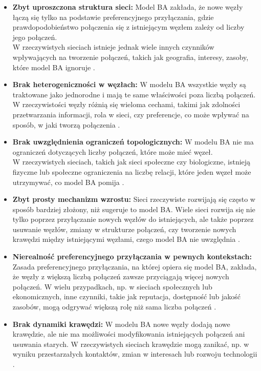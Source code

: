\begin{itemize}
      \item \textbf{Zbyt uproszczona struktura sieci:} Model BA zakłada, że nowe węzły łączą się tylko na podstawie preferencyjnego przyłączania,
            gdzie prawdopodobieństwo połączenia się z istniejącym węzłem zależy od liczby jego połączeń.
            \\ W rzeczywistych sieciach istnieje jednak wiele innych czynników wpływających na tworzenie połączeń, takich jak geografia, interesy, zasoby, które model BA ignoruje \cite{Newman2003}.

      \item \textbf{Brak heterogeniczności w węzłach:} W modelu BA wszystkie węzły są traktowane jako jednorodne i mają te same właściwości poza liczbą połączeń.
            W rzeczywistości węzły różnią się wieloma cechami, takimi jak zdolności przetwarzania informacji, rola w sieci, czy preferencje, co może wpływać na sposób, w jaki tworzą połączenia \cite{Klemm2002}.

      \item \textbf{Brak uwzględnienia ograniczeń topologicznych:} W modelu BA nie ma ograniczeń dotyczących liczby połączeń, które może mieć węzeł.
            \\ W rzeczywistych sieciach, takich jak sieci społeczne czy biologiczne, istnieją fizyczne lub społeczne ograniczenia na liczbę relacji, które jeden węzeł może utrzymywać, co model BA pomija \cite{Amaral2000}.

      \item \textbf{Zbyt prosty mechanizm wzrostu:} Sieci rzeczywiste rozwijają się często w sposób bardziej złożony, niż sugeruje to model BA.
            Wiele sieci rozwija się nie tylko poprzez przyłączanie nowych węzłów do istniejących, ale także poprzez usuwanie węzłów, zmiany w strukturze połączeń,
            czy tworzenie nowych krawędzi między istniejącymi węzłami, czego model BA nie uwzględnia \cite{Dorogovtsev2002}.

      \item \textbf{Nierealność preferencyjnego przyłączania w pewnych kontekstach:} Zasada preferencyjnego przyłączania, na której opiera się model BA,
            zakłada, że węzły z większą liczbą połączeń zawsze przyciągają więcej nowych połączeń.
            W wielu przypadkach, np. w sieciach społecznych lub ekonomicznych, inne czynniki,
            takie jak reputacja, dostępność lub jakość zasobów, mogą odgrywać większą rolę niż sama liczba połączeń \cite{Boccaletti2006}.

      \item \textbf{Brak dynamiki krawędzi:} W modelu BA nowe węzły dodają nowe krawędzie, ale nie ma możliwości modyfikowania istniejących połączeń ani usuwania starych.
            W rzeczywistych sieciach krawędzie mogą zanikać, np. w wyniku przestarzałych kontaktów, zmian w interesach lub rozwoju technologii \cite{Holme2002}.
\end{itemize}

